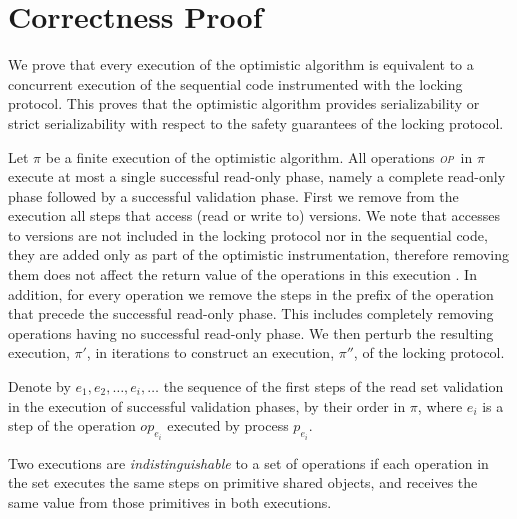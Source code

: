\newcommand{\op}{\emph{\textsc{op}}}
\newcommand{\opt}{\textsc{opt}}

\section{Correctness Proof}
\label{sec:proof}

We prove that every execution of the optimistic algorithm is equivalent to a
concurrent execution of the sequential code instrumented with the locking
protocol. 
This proves that the optimistic algorithm provides serializability or strict
serializability with respect to the safety guarantees of the locking protocol.

Let $\pi$ be a finite execution of the optimistic algorithm. All
operations \op\ in $\pi$ execute at most a single successful read-only
phase, namely a complete read-only phase followed by a successful validation
phase.
First we remove
from the execution all steps that access (read or write to) versions. 
We note that accesses to versions are not included in the locking protocol 
nor in the sequential code, they are added only as part of the
optimistic instrumentation, therefore removing them does not affect the return
value of the operations in this execution . In addition, for every operation we remove the steps in the prefix
of the operation that precede the successful read-only phase. 
This includes completely removing operations having no successful read-only
phase. 
We then perturb the
resulting execution, $\pi'$, in iterations to construct an execution, $\pi''$, of the locking protocol.

Denote by $e_1, e_2, \ldots, e_i, \ldots$ the sequence of the first steps of the
read set validation in the execution of successful validation phases, by their
order in $\pi$, where $e_i$ is a step of the operation $op_{e_i}$ executed by process $p_{e_i}$.


Two executions are \emph{indistinguishable} to a set of operations if each
operation in the set executes the same steps on primitive shared objects, and
receives the same value from those primitives in both executions.


